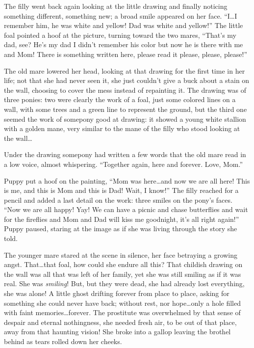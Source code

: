 The filly went back again looking at the little drawing and finally noticing something different, something new; a broad smile appeared on her face. ``I\dots I remember him, he was white and yellow! Dad was white and yellow!'' The little foal pointed a hoof at the picture, turning toward the two mares, ``That's my dad, see? He's my dad I didn't remember his color but now he is there with me and Mom! There is something written here, please read it please, please, please!''

The old mare lowered her head, looking at that drawing for the first time in her life; not that she had never seen it, she just couldn't give a buck about a stain on the wall, choosing to cover the mess instead of repainting it. The drawing was of three ponies: two were clearly the work of a foal, just some colored lines on a wall, with some trees and a green line to represent the ground, but the third one seemed the work of somepony good at drawing: it showed a young white stallion with a golden mane, very similar to the mane of the filly who stood looking at the wall\dots

Under the drawing somepony had written a few words that the old mare read in a low voice, almost whispering. ``Together again, here and forever. Love, Mom.''

Puppy put a hoof on the painting, ``Mom was here\dots and now we are all here! This is me, and this is Mom and this is Dad! Wait, I know!'' The filly reached for a pencil and added a last detail on the work: three smiles on the pony's faces. ``Now we are all happy! Yay! We can have a picnic and chase butterflies and wait for the fireflies and Mom and Dad will kiss me goodnight, it's all right again!'' Puppy paused, staring at the image as if she was living through the story she told.

The younger mare stared at the scene in silence, her face betraying a growing angst. That\dots that foal, how could she endure all this? That childish drawing on the wall was all that was left of her family, yet she was still smiling as if it was real. She was \emph{smiling}! But, but they were dead, she had already lost everything, she was alone! A little ghost drifting forever from place to place, asking for something she could never have back; without rest, nor hope\dots only a hole filled with faint memories\dots forever. The prostitute was overwhelmed by that sense of despair and eternal nothingness, she needed fresh air, to be out of that place, away from that haunting vision! She broke into a gallop leaving the brothel behind as tears rolled down her cheeks.

